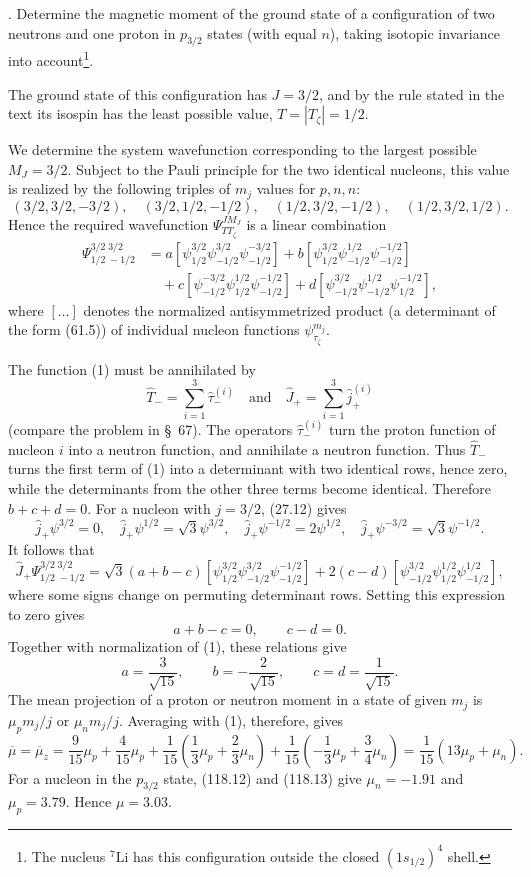 . Determine the magnetic moment of the ground state of a
configuration of two neutrons and one proton in $p_{3/2}$ states (with equal
$n$), taking isotopic invariance into account\footnote{The nucleus
${}^{7}\mathrm{Li}$ has this configuration outside the closed
$(1s_{1/2})^4$ shell.}.

\SolutionHeading The ground state of this configuration has $J=3/2$, and by
the rule stated in the text its isospin has the least possible value,
$T=|T_\zeta|=1/2$.

We determine the system wavefunction corresponding to the largest possible
$M_J=3/2$. Subject to the Pauli principle for the two identical nucleons, this
value is realized by the following triples of $m_j$ values for $p,n,n$:
\[
 (3/2,3/2,-3/2),\quad(3/2,1/2,-1/2),\quad
 (1/2,3/2,-1/2),\quad(1/2,3/2,1/2).
\]
Hence the required wavefunction $\Psi^{JM_J}_{TT_\zeta}$ is a linear
combination
\begin{equation}
 \begin{split}
 \Psi^{3/2\;3/2}_{1/2\;-1/2}
 &=a[\psi^{3/2}_{1/2}\psi^{3/2}_{-1/2}\psi^{-3/2}_{-1/2}]
 +b[\psi^{3/2}_{1/2}\psi^{1/2}_{-1/2}\psi^{-1/2}_{-1/2}]\\
 &\quad+c[\psi^{-3/2}_{-1/2}\psi^{1/2}_{1/2}\psi^{-1/2}_{-1/2}]
 +d[\psi^{3/2}_{-1/2}\psi^{1/2}_{-1/2}\psi^{-1/2}_{1/2}],
 \end{split}
 \tag{1}
\end{equation}
where $[\ldots]$ denotes the normalized antisymmetrized product (a determinant
of the form (61.5)) of individual nucleon functions
$\psi^{m_j}_{\tau_\zeta}$.

The function (1) must be annihilated by
\[
 \hat T_- =\sum_{i=1}^3\hat\tau_-^{(i)}
 \quad\text{and}\quad
 \hat J_+=\sum_{i=1}^3\hat j_+^{(i)}
\]
(compare the problem in \S~67). The operators $\hat\tau_-^{(i)}$ turn the
proton function of nucleon $i$ into a neutron function, and annihilate a
neutron function. Thus $\hat T_-$ turns the first term of (1) into a
determinant with two identical rows, hence zero, while the determinants from
the other three terms become identical. Therefore $b+c+d=0$. For a nucleon
with $j=3/2$, (27.12) gives
\[
 \hat j_+\psi^{3/2}=0,\quad
 \hat j_+\psi^{1/2}=\sqrt3\psi^{3/2},\quad
 \hat j_+\psi^{-1/2}=2\psi^{1/2},\quad
 \hat j_+\psi^{-3/2}=\sqrt3\psi^{-1/2}.
\]
It follows that
\[
 \hat J_+\Psi^{3/2\;3/2}_{1/2\;-1/2}
 =\sqrt3(a+b-c)[\psi^{3/2}_{1/2}\psi^{3/2}_{-1/2}\psi^{-1/2}_{-1/2}]
 +2(c-d)[\psi^{3/2}_{-1/2}\psi^{1/2}_{1/2}\psi^{1/2}_{-1/2}],
\]
where some signs change on permuting determinant rows. Setting this expression
to zero gives
\[
 a+b-c=0,\qquad c-d=0.
\]
Together with normalization of (1), these relations give
\[
 a=\frac3{\sqrt{15}},\qquad b=-\frac2{\sqrt{15}},\qquad
 c=d=\frac1{\sqrt{15}}.
\]
The mean projection of a proton or neutron moment in a state of given $m_j$ is
$\mu_pm_j/j$ or $\mu_nm_j/j$. Averaging with (1), therefore, gives
\[
 \overline\mu=\overline\mu_z
 =\frac9{15}\mu_p+\frac4{15}\mu_p
 +\frac1{15}\left(\frac13\mu_p+\frac23\mu_n\right)
 +\frac1{15}\left(-\frac13\mu_p+\frac34\mu_n\right)
 =\frac1{15}(13\mu_p+\mu_n).
\]
For a nucleon in the $p_{3/2}$ state, (118.12) and (118.13) give
$\mu_n=-1{.}91$ and $\mu_p=3{.}79$. Hence $\mu=3{.}03$.
